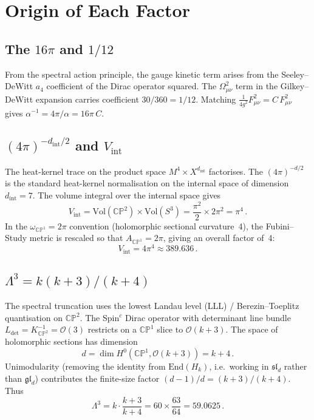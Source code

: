 \documentclass[11pt]{article}
\newcommand{\CP}{\mathbb{CP}}
\newcommand{\slp}{\mathfrak{sl}}
\begin{document}
\section{Origin of Each Factor}

\subsection{The $16\pi$ and $1/12$}

From the spectral action principle, the gauge kinetic term arises from the
Seeley--DeWitt $a_4$ coefficient of the Dirac operator squared.  The
$\Omega_{\mu\nu}^2$ term in the Gilkey--DeWitt expansion carries coefficient
$30/360 = 1/12$.  Matching $\frac{1}{4g^2}F_{\mu\nu}^2 = C\,F_{\mu\nu}^2$
gives $\alpha^{-1} = 4\pi/\alpha = 16\pi\,C$.

\subsection{$(4\pi)^{-d_{\mathrm{int}}/2}$ and $V_{\mathrm{int}}$}

The heat-kernel trace on the product space $M^4 \times X^{d_{\mathrm{int}}}$
factorises.  The $(4\pi)^{-d/2}$ is the standard heat-kernel normalisation on
the internal space of dimension $d_{\mathrm{int}} = 7$.  The volume integral
over the internal space gives
\[
V_{\mathrm{int}}
= \mathrm{Vol}(\CP^2) \times \mathrm{Vol}(S^3)
= \frac{\pi^2}{2} \times 2\pi^2 = \pi^4\,.
\]
In the $\omega_{\CP^1} = 2\pi$ convention (holomorphic sectional curvature~4),
the Fubini--Study metric is rescaled so that $A_{\CP^1} = 2\pi$, giving an
overall factor of~4:
\[
V_{\mathrm{int}} = 4\pi^4 \approx 389.636\,.
\]

\subsection{$\Lambda^3 = k(k+3)/(k+4)$}

The spectral truncation uses the lowest Landau level (LLL) / Berezin--Toeplitz
quantisation on $\CP^2$.  The Spin$^c$ Dirac operator with determinant line
bundle $L_{\det} = K_{\CP^2}^{-1} = \mathcal{O}(3)$ restricts on a $\CP^1$
slice to $\mathcal{O}(k+3)$.  The space of holomorphic sections has dimension
\[
d = \dim H^0(\CP^1, \mathcal{O}(k+3)) = k + 4\,.
\]
Unimodularity (removing the identity from $\mathrm{End}(H_k)$, i.e.\
working in $\slp_d$ rather than $\mathfrak{gl}_d$) contributes the
finite-size factor $(d-1)/d = (k+3)/(k+4)$.  Thus
\[
\Lambda^3 = k \cdot \frac{k+3}{k+4}
= 60 \times \frac{63}{64} = 59.0625\,.
\]
\end{document}
